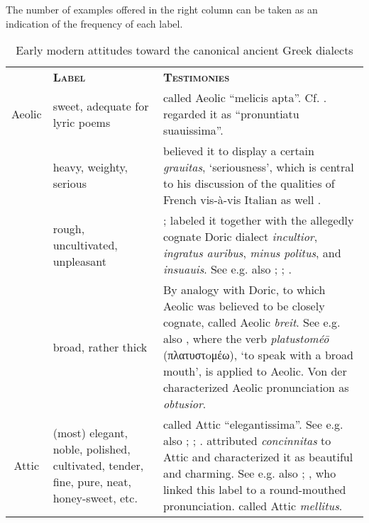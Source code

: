 \begin{table}
\caption{Early modern attitudes toward the canonical ancient Greek dialects}\label{tab:7.2}

The number of examples offered in the right column can be taken as an indication of the frequency of each label.

 
\begin{tabularx}{\textwidth}{XXX}
\lsptoprule

\multicolumn{1}{c}{\textbf{\textsc{Dialect}}} & \textbf{\textsc{Label}} & \textbf{\textsc{Testimonies}}\\
\multicolumn{1}{c}{Aeolic} & sweet, adequate for lyric poems & \citet[a.4\textsc{\textsuperscript{r}}]{Canini1555} called Aeolic “melicis apta”. Cf. \citet[103]{Hoius1620}. \citet[106]{Giraudeau1739} regarded it as “pronuntiatu suauissima”.\\
& heavy, weighty, serious & \citet[16]{Estienne1581} believed it to display a certain \textit{grauitas}, ‘seriousness’, which is central to his discussion of the qualities of French vis-à-vis Italian as well \citep[71]{Swiggers2009}.\\
 & rough, uncultivated, unpleasant & \citet[61]{Walper1589}; \citet[415]{Walper1590} labeled it together with the allegedly cognate Doric dialect \textit{incultior}, \textit{ingratus auribus}, \textit{minus politus}, and \textit{insuauis}. See e.g. also \citet[515 (\textit{asper})]{Fabricius1711}; \citet[6 (\textit{rudis})]{Georgi1729}; \citet[e.g. 28 (\textit{inamoenus})]{Munthe1748}.\\
 & broad, rather thick & By analogy with Doric, to which Aeolic was believed to be closely cognate, \citet[582]{Nibbe1725} called Aeolic \textit{breit}. See e.g. also \citet[\textsc{a.2}\textsc{\textsuperscript{v}}]{Hauptmann1776}, where the verb \textit{platustoméo\={} } (πλατυστoμέω), ‘to speak with a broad mouth’, is applied to Aeolic. Von der \citet[17]{Von1705} characterized Aeolic pronunciation as \textit{obtusior}.\\
\multicolumn{1}{c}{Attic} & (most) elegant, noble, polished, cultivated, tender, fine, pure, neat, honey-sweet, etc. & \citet[a.i\textsc{\textsuperscript{v}}]{Melanchthon1518} called Attic “elegantissima”. See e.g. also \citet[209]{Vergara1537}; \citet[5\textsc{\textsuperscript{r}}]{Baile1588}; \citet[334]{Alsted1630}. \citet[226]{Ruland1556} attributed \textit{concinnitas} to Attic and characterized it as beautiful and charming. See e.g. also \citet[\textsc{e}.iii\textsc{\textsuperscript{v}}]{Oreadini1525}; \citet[76, 112, 424]{Saumaise1643a}, who linked this label to a round-mouthed pronunciation. \citet[96]{Hoius1620} called Attic \textit{mellitus}.\\

\end{tabularx}
\end{table}
